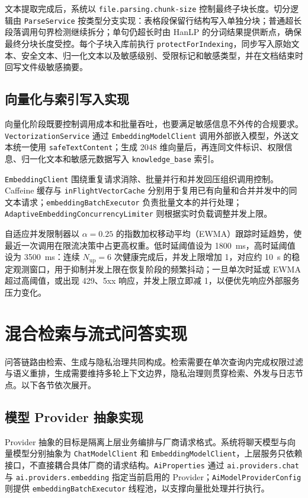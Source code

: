 文本提取完成后，系统以 \texttt{file.parsing.chunk-size} 控制最终子块长度。切分逻辑由 \texttt{ParseService} 按类型分支实现：表格段保留行结构写入单独分块；普通超长段落调用句界检测继续拆分；单句仍超长时由 HanLP 的分词结果提供断点，确保最终分块长度受控。每个子块入库前执行 \texttt{protectForIndexing}，同步写入原始文本、安全文本、归一化文本以及敏感级别、受限标记和敏感类型，并在文档结束时回写文件级敏感摘要。

\subsection{向量化与索引写入实现}

向量化阶段既要控制调用成本和批量吞吐，也要满足敏感信息不外传的合规要求。\texttt{VectorizationService} 通过 \texttt{EmbeddingModelClient} 调用外部嵌入模型，外送文本统一使用 \texttt{safeTextContent}；生成 2048 维向量后，再连同文件标识、权限信息、归一化文本和敏感元数据写入 \texttt{knowledge\_base} 索引。

\texttt{EmbeddingClient} 围绕重复请求消除、批量并行和并发回压组织调用控制。Caffeine 缓存与 \texttt{inFlightVectorCache} 分别用于复用已有向量和合并并发中的同文本请求；\texttt{embeddingBatchExecutor} 负责批量文本的并行处理；\texttt{AdaptiveEmbeddingConcurrencyLimiter} 则根据实时负载调整并发上限。

自适应并发限制器以 $\alpha=0.25$ 的指数加权移动平均（EWMA）跟踪时延趋势，使最近一次调用在限流决策中占更高权重。低时延阈值设为 1800~ms，高时延阈值设为 3500~ms：连续 $N_{\text{up}}=6$ 次健康完成后，并发上限增加 1，对应约 10~s 的稳定观测窗口，用于抑制并发上限在恢复阶段的频繁抖动；一旦单次时延或 EWMA 超过高阈值，或出现 429、5xx 响应，并发上限立即减 1，以便优先响应外部服务压力变化。

\section{混合检索与流式问答实现}
\label{sec:chat_impl}

问答链路由检索、生成与隐私治理共同构成。检索需要在单次查询内完成权限过滤与语义重排，生成需要维持多轮上下文边界，隐私治理则贯穿检索、外发与日志节点。以下各节依次展开。

\subsection{模型 Provider 抽象实现}

Provider 抽象的目标是隔离上层业务编排与厂商请求格式。系统将聊天模型与向量模型分别抽象为 \texttt{ChatModelClient} 和 \texttt{EmbeddingModelClient}，上层服务只依赖接口，不直接耦合具体厂商的请求结构。\texttt{AiProperties} 通过 \texttt{ai.providers.chat} 与 \texttt{ai.providers.embedding} 指定当前启用的 Provider；\texttt{AiModelProviderConfig} 则提供 \texttt{embeddingBatchExecutor} 线程池，以支撑向量批处理并行执行。

